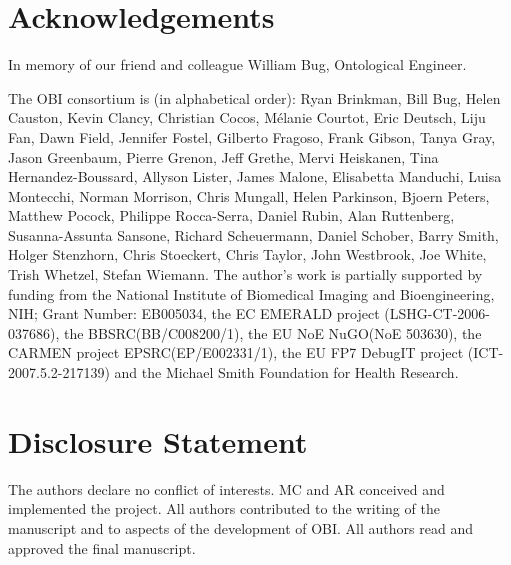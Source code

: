 \documentclass{elsart}       %
\begin{document}
\section{Acknowledgements}

In memory of our friend and colleague William Bug, Ontological Engineer. 

The OBI consortium is (in alphabetical order): Ryan Brinkman, Bill Bug, Helen Causton, Kevin Clancy, Christian Cocos, M\'elanie Courtot, Eric Deutsch, Liju Fan, Dawn Field, Jennifer Fostel, Gilberto Fragoso, Frank Gibson, Tanya Gray, Jason Greenbaum, Pierre Grenon, Jeff Grethe, Mervi Heiskanen, Tina Hernandez-Boussard, Allyson Lister, James Malone, Elisabetta Manduchi, Luisa Montecchi, Norman Morrison, Chris Mungall, Helen Parkinson, Bjoern Peters, Matthew Pocock, Philippe Rocca-Serra, Daniel Rubin, Alan Ruttenberg, Susanna-Assunta Sansone, Richard Scheuermann, Daniel Schober, Barry Smith, Holger Stenzhorn, Chris Stoeckert, Chris Taylor, John Westbrook,  Joe White, Trish Whetzel, Stefan Wiemann. The author’s work is partially supported by funding from the National Institute of Biomedical Imaging and Bioengineering, NIH; Grant Number: EB005034, the EC EMERALD project (LSHG-CT-2006-037686), the BBSRC(BB/C008200/1), the EU NoE NuGO(NoE 503630), the CARMEN project EPSRC(EP/E002331/1), the EU FP7 DebugIT project (ICT-2007.5.2-217139) and the Michael Smith Foundation for Health Research.

\section{Disclosure Statement}

The authors declare no conflict of interests. 
MC and AR conceived and implemented the project. All authors contributed to the writing of the manuscript and to aspects of the development of OBI. All authors read and approved the final manuscript.




\end{document}
